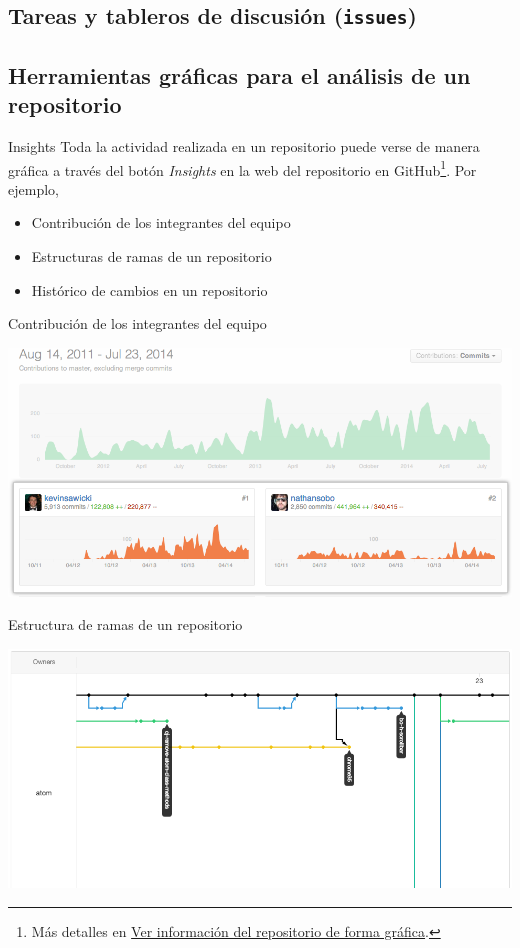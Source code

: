 \documentclass[xcolor={usenames,svgnames,dvipsnames}]{beamer}
\begin{document}
\subsection{Tareas y tableros de discusión (\texttt{issues})}
\label{sec:org070e048}
\subsection{Herramientas gráficas para el análisis de un repositorio}
\label{sec:org891a9d4}
\begin{frame}[label={sec:org9039673}]{Insights}
Toda la actividad realizada en un repositorio puede verse de manera gráfica a través del botón \emph{Insights} en la web del repositorio en GitHub\footnote{Más detalles en \href{https://help.github.com/categories/visualizing-repository-data-with-graphs/}{Ver información del repositorio de forma gráfica}.}. Por ejemplo,

\begin{itemize}
\item Contribución de los integrantes del equipo
\item Estructuras de ramas de un repositorio
\item Histórico de cambios en un repositorio
\end{itemize}
\end{frame}

\begin{frame}[label={sec:org3ea72cf}]{Contribución de los integrantes del equipo}
\begin{center}
\includegraphics[width=.9\linewidth]{figs/repo_contributors_specific_graph.png}
\end{center}
\end{frame}

\begin{frame}[label={sec:org45e952d}]{Estructura de ramas de un repositorio}
\begin{center}
\includegraphics[width=.9\linewidth]{figs/repo_network_graph.png}
\end{center}
\end{frame}
\end{document}
